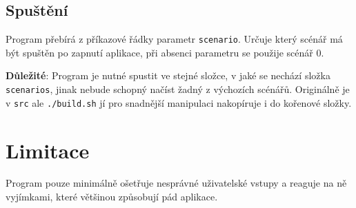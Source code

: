 \documentclass[12pt]{article}
\newcommand{\code}[1]{\mbox{\texttt{#1}}}
\begin{document}
\subsection{Spuštění}

Program přebírá z příkazové řádky parametr \code{scenario}.
Určuje který scénář má být spuštěn po zapnutí aplikace, při absenci parametru
se použije scénář 0.

\textbf{Důležité}: Program je nutné spustit ve stejné složce, v jaké se nechází
složka \code{scenarios}, jinak nebude schopný načíst žadný z výchozích scénářů.
Originálně je v \code{src} ale \code{./build.sh} jí pro snadnější manipulaci 
nakopíruje i do kořenové složky.

\section{Limitace}

Program pouze minimálně ošetřuje nesprávné uživatelské vstupy a reaguje na ně
vyjímkami, které většinou způsobují pád aplikace. 
\end{document}
